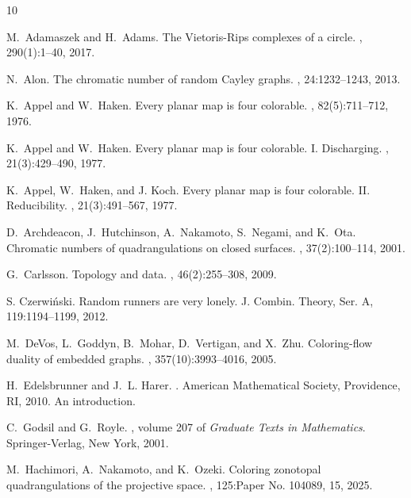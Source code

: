 \documentclass[11pt, amsfonts]{amsart}
\numberwithin{equation}{section}
\theoremstyle{definition}
\theoremstyle{remark}
\begin{document}

%
\begin{thebibliography}{10}

M.~Adamaszek and H.~Adams.
\newblock The {V}ietoris-{R}ips complexes of a circle.
, 290(1):1--40, 2017.

N.~Alon.
\newblock The chromatic number of random Cayley graphs.
, 24:1232--1243, 2013.

K.~Appel and W.~Haken.
\newblock Every planar map is four colorable.
, 82(5):711--712, 1976.

K.~Appel and W.~Haken.
\newblock Every planar map is four colorable. {I}. {D}ischarging.
, 21(3):429--490, 1977.

K.~Appel, W.~Haken, and J. Koch.
\newblock Every planar map is four colorable. {II}. {R}educibility.
, 21(3):491--567, 1977.

D.~Archdeacon, J.~Hutchinson, A.~Nakamoto, S.~Negami, and K.~Ota.
\newblock Chromatic numbers of quadrangulations on closed surfaces.
, 37(2):100--114, 2001.

G.~Carlsson.
\newblock Topology and data.
, 46(2):255--308, 2009.

S. Czerwi\'nski.
\newblock Random runners are very lonely.
\newblock J. Combin. Theory, Ser. A, 119:1194--1199, 2012.


M.~DeVos, L.~Goddyn, B.~Mohar, D.~Vertigan, and X.~Zhu.
\newblock Coloring-flow duality of embedded graphs.
, 357(10):3993--4016, 2005.

H.~Edelsbrunner and J.~L. Harer.
.
\newblock American Mathematical Society, Providence, RI, 2010.
\newblock An introduction.

C.~Godsil and G.~Royle.
, volume 207 of {\em Graduate Texts in
  Mathematics}.
\newblock Springer-Verlag, New York, 2001.

M.~Hachimori, A.~Nakamoto, and K.~Ozeki.
\newblock Coloring zonotopal quadrangulations of the projective space.
, 125:Paper No. 104089, 15, 2025.


\end{thebibliography}
\end{document}
